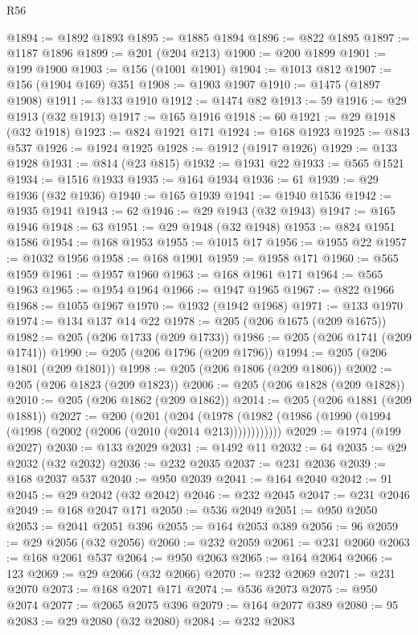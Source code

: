 \begin{lexlean}{R56}
\begin{coremodule}
{{{{{{{{{{{{{{{{{{{{{{{{{{{{{{{{{{{{{{{{{{{{{{{{{{{{{{{{{{{{{{{{{{{{{{{{{{{{{{{{{{{{{{{{{{{{{{{{{{{{{{{{{{{{{{{{{{{{{{{{{{{{{{{{{{{{{{{{{{{{{{{{{{{{{{{{{{{{{{{{{{{{{{{{{{{{{{{{{{{{{{{{{{{{{{{{{{{{{{{{{{{{{{{{{{{@1894 := @1892 @1893
@1895 := @1885 @1894
@1896 := @822 @1895
@1897 := @1187 @1896
@1899 := @201 (@204 @213)
@1900 := @200 @1899
@1901 := @199 @1900
@1903 := @156 (@1001 @1901)
@1904 := @1013 @812
@1907 := @156 (@1904 @169) @351
@1908 := @1903 @1907
@1910 := @1475 (@1897 @1908)
@1911 := @133 @1910
@1912 := @1474 @82
@1913 := 59
@1916 := @29 @1913 (@32 @1913)
@1917 := @165 @1916
@1918 := 60
@1921 := @29 @1918 (@32 @1918)
@1923 := @824 @1921 @171
@1924 := @168 @1923
@1925 := @843 @537
@1926 := @1924 @1925
@1928 := @1912 (@1917 @1926)
@1929 := @133 @1928
@1931 := @814 (@23 @815)
@1932 := @1931 @22
@1933 := @565 @1521
@1934 := @1516 @1933
@1935 := @164 @1934
@1936 := 61
@1939 := @29 @1936 (@32 @1936)
@1940 := @165 @1939
@1941 := @1940 @1536
@1942 := @1935 @1941
@1943 := 62
@1946 := @29 @1943 (@32 @1943)
@1947 := @165 @1946
@1948 := 63
@1951 := @29 @1948 (@32 @1948)
@1953 := @824 @1951 @1586
@1954 := @168 @1953
@1955 := @1015 @17
@1956 := @1955 @22
@1957 := @1032 @1956
@1958 := @168 @1901
@1959 := @1958 @171
@1960 := @565 @1959
@1961 := @1957 @1960
@1963 := @168 @1961 @171
@1964 := @565 @1963
@1965 := @1954 @1964
@1966 := @1947 @1965
@1967 := @822 @1966
@1968 := @1055 @1967
@1970 := @1932 (@1942 @1968)
@1971 := @133 @1970
@1974 := @134 @137 @14 @22
@1978 := @205 (@206 @1675 (@209 @1675))
@1982 := @205 (@206 @1733 (@209 @1733))
@1986 := @205 (@206 @1741 (@209 @1741))
@1990 := @205 (@206 @1796 (@209 @1796))
@1994 := @205 (@206 @1801 (@209 @1801))
@1998 := @205 (@206 @1806 (@209 @1806))
@2002 := @205 (@206 @1823 (@209 @1823))
@2006 := @205 (@206 @1828 (@209 @1828))
@2010 := @205 (@206 @1862 (@209 @1862))
@2014 := @205 (@206 @1881 (@209 @1881))
@2027 := @200
    (@201
      (@204 (@1978 (@1982 (@1986 (@1990 (@1994 (@1998 (@2002 (@2006 (@2010 (@2014 @213))))))))))))
@2029 := @1974 (@199 @2027)
@2030 := @133 @2029
@2031 := @1492 @11
@2032 := 64
@2035 := @29 @2032 (@32 @2032)
@2036 := @232 @2035
@2037 := @231 @2036
@2039 := @168 @2037 @537
@2040 := @950 @2039
@2041 := @164 @2040
@2042 := 91
@2045 := @29 @2042 (@32 @2042)
@2046 := @232 @2045
@2047 := @231 @2046
@2049 := @168 @2047 @171
@2050 := @536 @2049
@2051 := @950 @2050
@2053 := @2041 @2051 @396
@2055 := @164 @2053 @389
@2056 := 96
@2059 := @29 @2056 (@32 @2056)
@2060 := @232 @2059
@2061 := @231 @2060
@2063 := @168 @2061 @537
@2064 := @950 @2063
@2065 := @164 @2064
@2066 := 123
@2069 := @29 @2066 (@32 @2066)
@2070 := @232 @2069
@2071 := @231 @2070
@2073 := @168 @2071 @171
@2074 := @536 @2073
@2075 := @950 @2074
@2077 := @2065 @2075 @396
@2079 := @164 @2077 @389
@2080 := 95
@2083 := @29 @2080 (@32 @2080)
@2084 := @232 @2083
}}}}}}}}}}}}}}}}}}}}}}}}}}}}}}}}}}}}}}}}}}}}}}}}}}}}}}}}}}}}}}}}}}}}}}}}}}}}}}}}}}}}}}}}}}}}}}}}}}}}}}}}}}}}}}}}}}}}}}}}}}}}}}}}}}}}}}}}}}}}}}}}}}}}}}}}}}}}}}}}}}}}}}}}}}}}}}}}}}}}}}}}}}}}}}}}}}}}}}}}}}}}}}}}}}}
\end{coremodule}
\end{lexlean}
